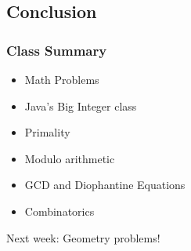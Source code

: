 \documentclass{beamer}
\begin{document}
\subsection{Conclusion}
\begin{frame}
  \frametitle{Class Summary}
  \begin{itemize}
  \item Math Problems
  \item Java's Big Integer class
  \item Primality
  \item Modulo arithmetic
  \item GCD and Diophantine Equations
  \item Combinatorics
  \end{itemize}

  \begin{block}{}
    Next week: Geometry problems!
  \end{block}
\end{frame}

% 
%
%
%
\end{document}
